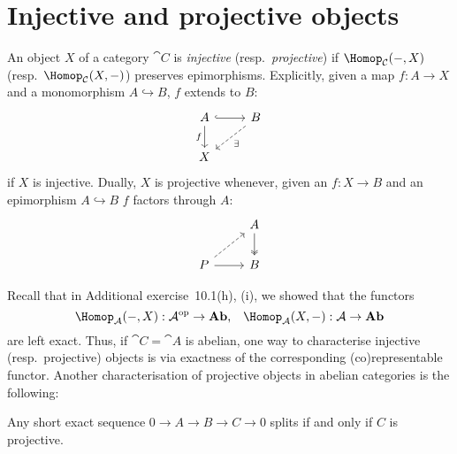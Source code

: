 \documentclass[../main.tex]{subfiles}
\begin{document}
\section{Injective and projective objects}

\begin{defn}
    An object \(X\) of a category \(\cat C\) is \emph{injective} (resp.~\emph{projective}) if $\Hom[\cat C](-, X)$ (resp.~$\Hom[\cat C](X,-)$) preserves epimorphisms. Explicitly, given a map $f\colon A\to X$ and a monomorphism $A\hookrightarrow B$, $f$ extends to $B$:
    \[\begin{tikzcd}
    	A & B \\
    	X
    	\arrow[hook, from=1-1, to=1-2]
    	\arrow["f"', from=1-1, to=2-1]
    	\arrow["\exists", dashed, from=1-2, to=2-1]
    \end{tikzcd}\] if $X$ is injective.
    Dually, $X$ is projective whenever, given an $f\colon X\to B$ and an epimorphism $A\hookrightarrow B$ $f$ factors through $A$:
    \[\begin{tikzcd}
    	& A \\
    	P & B
    	\arrow[two heads, from=1-2, to=2-2]
    	\arrow[dashed, from=2-1, to=1-2]
    	\arrow[from=2-1, to=2-2]
    \end{tikzcd}\]
\end{defn}

Recall that in Additional exercise~10.1(h), (i), we showed that the functors
\[\Hom[\cat A](-, X)\colon \cat A\opp \to \catAbelianGroup\text{,} \quad \Hom[\cat A](X, -)\colon \cat A\to \catAbelianGroup\]
are left exact.
Thus, if $\cat C = \cat A$ is abelian, one way to characterise injective (resp.~projective) objects is via exactness of the corresponding (co)representable functor. Another characterisation of projective objects in abelian categories is the following:
\begin{exc}
    Any short exact sequence $0\to A \to B \to C \to 0$ splits if and only if $C$ is projective.
\end{exc}
\end{document}
